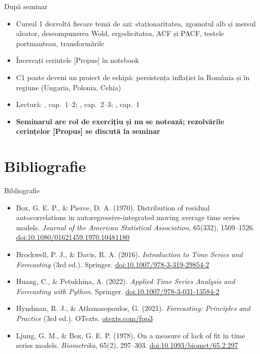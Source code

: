 \begin{frame}{După seminar}
\itemsize{\small}
\begin{itemize}
    \item Cursul 1 dezvoltă fiecare temă de azi: staționaritatea, zgomotul alb și mersul aleator, descompunerea Wold, ergodicitatea, ACF și PACF, testele portmanteau, transformările
    \item Încercați cerințele [Propus] în notebook
    \item C1 poate deveni un proiect de echipă: persistența inflației în România și în regiune (Ungaria, Polonia, Cehia)
    \item Lectură: , cap.~1--2; , cap.~2--3; , cap.~1
    \item \textbf{Seminarul are rol de exercițiu și nu se notează; rezolvările cerințelor [Propus] se discută la seminar}
\end{itemize}
\end{frame}


\section{Bibliografie}

\begin{frame}{Bibliografie}
\itemsize{\tiny}
\begin{itemize}
    \item Box, G. E. P., \& Pierce, D. A. (1970). Distribution of residual autocorrelations in autoregressive-integrated moving average time series models. \textit{Journal of the American Statistical Association}, 65(332), 1509--1526. \href{https://doi.org/10.1080/01621459.1970.10481180}{doi:10.1080/01621459.1970.10481180}
    \item Brockwell, P. J., \& Davis, R. A. (2016). \textit{Introduction to Time Series and Forecasting} (3rd ed.). Springer. \href{https://doi.org/10.1007/978-3-319-29854-2}{doi:10.1007/978-3-319-29854-2}
    \item Huang, C., \& Petukhina, A. (2022). \textit{Applied Time Series Analysis and Forecasting with Python}. Springer. \href{https://doi.org/10.1007/978-3-031-13584-2}{doi:10.1007/978-3-031-13584-2}
    \item Hyndman, R. J., \& Athanasopoulos, G. (2021). \textit{Forecasting: Principles and Practice} (3rd ed.). OTexts. \href{https://otexts.com/fpp3/}{otexts.com/fpp3}
    \item Ljung, G. M., \& Box, G. E. P. (1978). On a measure of lack of fit in time series models. \textit{Biometrika}, 65(2), 297--303. \href{https://doi.org/10.1093/biomet/65.2.297}{doi:10.1093/biomet/65.2.297}
\end{itemize}
\end{frame}


